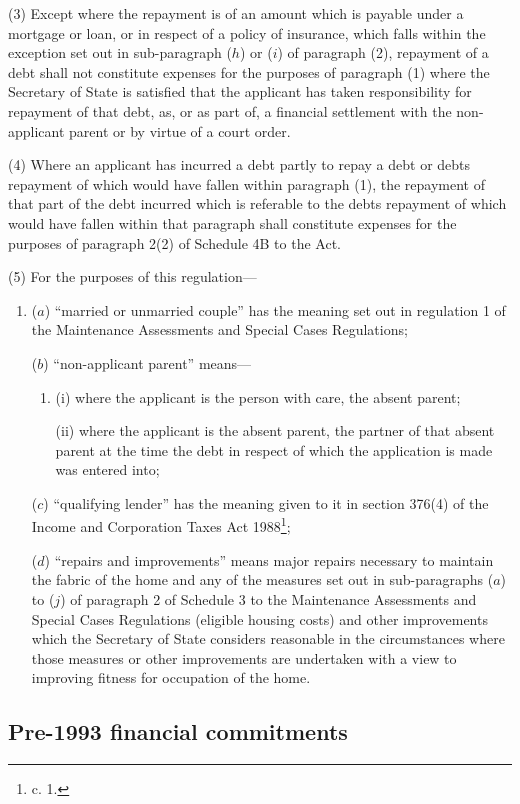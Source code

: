 \documentclass[a4paper]{article}
\begin{document}
(3) Except where the repayment is of an amount which is payable under a mortgage
or loan, or in respect of a policy of insurance, which falls within the
exception set out in sub-paragraph ($h$) or ($i$) of paragraph (2), repayment of a
debt shall not constitute expenses for the purposes of paragraph (1) where the
Secretary of State is satisfied that the applicant has taken responsibility for
repayment of that debt, as, or as part of, a financial settlement with the
non-applicant parent or by virtue of a court order.

(4) Where an applicant has incurred a debt partly to repay a debt or debts
repayment of which would have fallen within paragraph (1), the repayment of that
part of the debt incurred which is referable to the debts repayment of which
would have fallen within that paragraph shall constitute expenses for the
purposes of paragraph 2(2) of Schedule 4B to the Act.

(5) For the purposes of this regulation—
\begin{enumerate}\item[]
($a$) “married or unmarried couple” has the meaning set out in regulation 1 of the
Maintenance Assessments and Special Cases Regulations;

($b$) “non-applicant parent” means—
\begin{enumerate}\item[]
(i) where the applicant is the person with care, the absent parent;

(ii) where the applicant is the absent parent, the partner of that absent parent
at the time the debt in respect of which the application is made was entered
into;
\end{enumerate}

($c$) “qualifying lender” has the meaning given to it in section 376(4) of the
Income and Corporation Taxes Act 1988\footnote{ c. 1.};

($d$) “repairs and improvements” means major repairs necessary to maintain the
fabric of the home and any of the measures set out in sub-paragraphs ($a$) to ($j$)
of paragraph 2 of Schedule 3 to the Maintenance Assessments and Special Cases
Regulations (eligible housing costs) and other improvements which the Secretary
of State considers reasonable in the circumstances where those measures or other
improvements are undertaken with a view to improving fitness for occupation of
the home.
\end{enumerate}

\subsection[17. Pre-1993 financial commitments]{Pre-1993 financial commitments}
\end{document}
